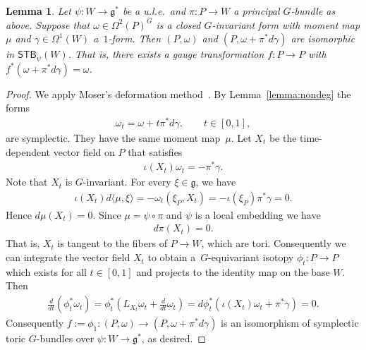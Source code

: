\documentclass[pdftex]{sigma}
\numberwithin{equation}{section}
\newtheorem{Lemma}{Lemma}[section]
\begin{document}
\begin{Lemma} \label{unique omega}
Let $\psi\colon W\to {\mathfrak g}^*$ be a u.l.e.\
  and $\pi \colon  P\xrightarrow{}W$ a principal $G$-bundle as above.
  Suppose that $\omega\in \Omega^2(P)^G$ is a closed $G$-invariant form with
  moment map $\mu$ and $\gamma\in \Omega^1 (W)$ a~$1$-form.  Then
  $(P,\omega)$ and $(P,\omega + \pi^* d\gamma)$ are isomorphic in
  ${\textsf{STB}}_\psi (W)$.  That is, there exists a gauge transformation
  $f\colon P\to P$ with $f^*(\omega + \pi^* d\gamma) = \omega$.
\end{Lemma}

\begin{proof}
We apply Moser's deformation method~\cite{moser}.  By Lemma~\ref{lemma:nondeg}
the forms
\begin{gather*}
\omega_t = \omega + t \pi^* d\gamma, \qquad t\in [0,1],
\end{gather*}
are symplectic. They have  the same moment map~$\mu$.
Let $X_t$ be the time-dependent vector f\/ield on $P$ that satisf\/ies
\begin{gather*}
\iota(X_t)\omega_t = - \pi^* \gamma.
\end{gather*}
Note that $X_t$ is $G$-invariant.
For every $\xi \in {\mathfrak g}$, we have
\begin{gather*}
\iota(X_t) d\langle \mu, \xi\rangle = -\omega_t(\xi_P,X_t) =
 - \iota(\xi_P) \pi^* \gamma =0.
\end{gather*}
Hence $d \mu ( X_t) = 0$. Since  $\mu = \psi \circ \pi$
and $\psi$ is a local embedding we have
\begin{gather*}
d \pi  (X_t) = 0.
\end{gather*}
That is, $X_t$ is tangent to the f\/ibers of $P\to W$, which
are tori.
Consequently we can integrate the vector f\/ield $X_t$ to obtain a~$G$-equivariant isotopy $\phi_t \colon P\to P$ which exists for all
$t\in [0,1]$
and projects to the identity map on the base $W$.  Then
\begin{gather*}
\frac{d}{dt} (\phi_t^* \omega_t)
 = \phi_t^* \left( L_{X_t} \omega_t + \frac{d}{dt} \omega_t\right)
 = d \phi_t^* (\iota(X_t) \omega_t + \pi^* \gamma) = 0.
\end{gather*}
Consequently $f := \phi_1\colon (P,\omega)\to (P,\omega + \pi^* d\gamma)$ is
an isomorphism of symplectic toric $G$-bundles over $\psi\colon W\to {\mathfrak g}^*$,
as desired.
\end{proof}
\end{document}
